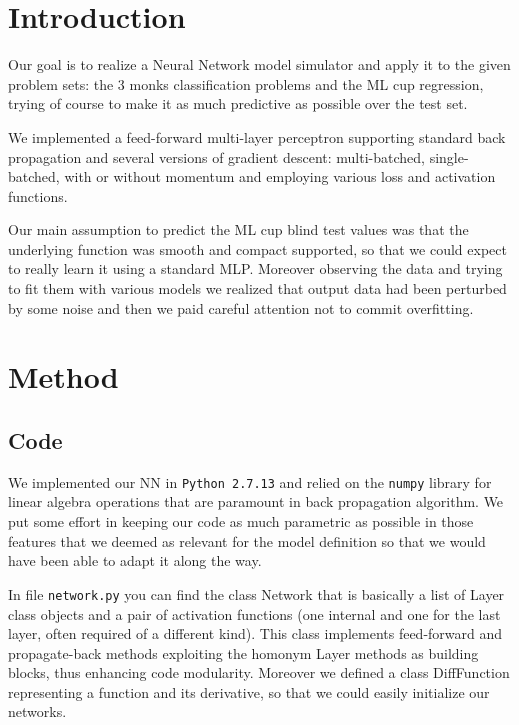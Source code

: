 \section{Introduction}

Our goal is to realize a Neural Network model simulator and apply it to the given problem sets: the 3 monks classification problems and the ML cup regression, trying of course to make it as much predictive as possible over the test set.

We implemented a feed-forward multi-layer perceptron supporting standard back propagation and several versions of gradient descent: multi-batched, single-batched, with or without momentum and employing various loss and activation functions.

Our main assumption to predict the ML cup blind test values was that the underlying function was smooth and compact supported, so that we could expect to really learn it using a standard MLP. Moreover observing the data and trying to fit them with various models we realized that output data had been perturbed by some noise and then we paid careful attention not to commit overfitting. 

\section{Method}

\subsection{Code}

We implemented our NN in \texttt{Python 2.7.13} and relied on the \texttt{numpy} library for linear algebra operations that are paramount in back propagation algorithm. We put some effort in keeping our code as much parametric as possible in those features that we deemed as relevant for the model definition so that we would have been able to adapt it along the way.

In file \texttt{network.py} you can find the class Network that is basically a list of Layer class objects and a pair of activation functions (one internal and one for the last layer, often required of a different kind). This class implements feed-forward and propagate-back methods exploiting the homonym Layer methods as building blocks, thus enhancing code modularity. Moreover we defined a class DiffFunction representing a function and its derivative, so that we could easily initialize our networks.

